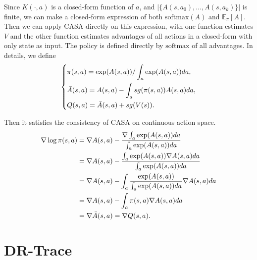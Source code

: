 {Since $K(\cdot, a)$ is a closed-form function of $a$, and $|\{A(s, a_0), \dots, A(s, a_k)\}|$ is finite, we can make a closed-form expression of both $\text{softmax}(A)$ and $\mathbb{E}_{\pi} [A]$. 
Then we can apply CASA directly on this expression, with one function estimates $V$ and the other function estimates advantages of all actions in a closed-form with only state as input.  
The policy is defined directly by $\text{softmax}$ of all advantages. 
In details, we define
\begin{equation}
\left\{
    \begin{aligned}
        &\pi(s, a) = \exp (A(s, a)) / \int_{a} \exp (A(s, a)) da, \\
        &\Bar{A}(s, a) = A(s, a) - \int_{a} sg(\pi(s, a)) A(s, a) da, \\
        &Q(s, a) = \Bar{A}(s, a) + sg(V(s)).
    \end{aligned}
\right. 
\end{equation}

Then it satisfies the consistency of CASA on continuous action space.
$$
\begin{aligned}
    \nabla \log \pi(s, a) &= \nabla A(s, a) - \frac{\nabla \int_{a} \exp (A(s, a)) da}{\int_{a} \exp (A(s, a)) da} \\
    &= \nabla A(s, a) - \frac{ \int_{a} \exp (A(s, a)) \nabla A(s, a) da}{\int_{a} \exp (A(s, a)) da} \\
    &= \nabla A(s, a) - \int_{a} \frac{  \exp (A(s, a)) }{\int_{a} \exp (A(s, a)) da} \nabla A(s, a) da \\
    &= \nabla A(s, a) - \int_{a} \pi(s, a) \nabla A(s, a) da \\
    &= \nabla \Bar{A}(s, a) = \nabla Q(s, a). 
\end{aligned}
$$
}

\section{DR-Trace}
\label{app:drtrace}


